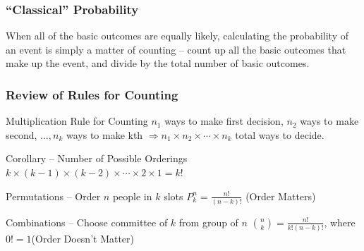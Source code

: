 \documentclass[handout]{beamer}
\begin{document}
\begin{frame}

\frametitle{``Classical'' Probability}

When all of the basic outcomes are equally likely, calculating the probability of an event is simply a matter of counting -- count up all the basic outcomes that make up the event, and divide by the total number of basic outcomes.

\end{frame}
\begin{frame}
\frametitle{Review of Rules for Counting}

\begin{block}{Multiplication Rule for Counting}
$n_1$ ways to make first decision, $n_2$ ways to make second, $\hdots, n_k$ ways to make kth $\Rightarrow n_1 \times n_2 \times \cdots \times n_k$ total ways to decide. \end{block}
\pause
\begin{block}{Corollary -- Number of Possible Orderings}
$k \times(k-1)\times (k-2) \times \cdots\times  2 \times 1 = k!$
\end{block}
\pause

\begin{block}{Permutations -- Order $n$ people in $k$ slots}
$P_k^n = \frac{n!}{(n-k)!}$ \hfill \alert{(Order Matters)}\end{block}
\pause

\begin{block}{Combinations -- Choose committee of $k$ from group of $n$}
${n \choose k} = \frac{n!}{k! (n-k)!}$, where $0! = 1$\hfill \alert{(Order Doesn't Matter)}\end{block}

\end{frame}
\end{document}
